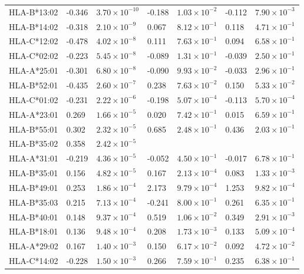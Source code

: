 \documentclass[]{article}
\begin{document}
\begin{doublespace}
\begin{longtable}[H]{p{3cm}p{1cm}p{2cm}p{1cm}p{2cm}p{1cm}p{2cm}}
		HLA-B*13:02 & -0.346 & $3.70 \times 10^{-10}$ & -0.188 & $1.03 \times 10^{-2}$ & -0.112 & $7.90 \times 10^{-3}$ \\ 
		HLA-B*14:02 & -0.318 & $2.10 \times 10^{-9}$ & 0.067 & $8.12 \times 10^{-1}$ & 0.118 & $4.71 \times 10^{-1}$ \\ 
		HLA-C*12:02 & -0.478 & $4.02 \times 10^{-8}$ & 0.111 & $7.63 \times 10^{-1}$ & 0.094 & $6.58 \times 10^{-1}$ \\ 
		HLA-C*02:02 & -0.223 & $5.45 \times 10^{-8}$ & -0.089 & $1.31 \times 10^{-1}$ & -0.039 & $2.50 \times 10^{-1}$ \\ 
		HLA-A*25:01 & -0.301 & $6.80 \times 10^{-8}$ & -0.090 & $9.93 \times 10^{-2}$ & -0.033 & $2.96 \times 10^{-1}$ \\ 
		HLA-B*52:01 & -0.435 & $2.60 \times 10^{-7}$ & 0.238 & $7.63 \times 10^{-2}$ & 0.150 & $5.33 \times 10^{-2}$ \\ 
		HLA-C*01:02 & -0.231 & $2.22 \times 10^{-6}$ & -0.198 & $5.07 \times 10^{-4}$ & -0.113 & $5.70 \times 10^{-4}$ \\ 
		HLA-A*23:01 & 0.269 & $1.66 \times 10^{-5}$ & 0.020 & $7.42 \times 10^{-1}$ & 0.015 & $6.59 \times 10^{-1}$ \\ 
		HLA-B*55:01 & 0.302 & $2.32 \times 10^{-5}$ & 0.685 & $2.48 \times 10^{-1}$ & 0.436 & $2.03 \times 10^{-1}$ \\ 
		HLA-B*35:02 & 0.358 & $2.42 \times 10^{-5}$ &  &  &  &  \\ 
		HLA-A*31:01 & -0.219 & $4.36 \times 10^{-5}$ & -0.052 & $4.50 \times 10^{-1}$ & -0.017 & $6.78 \times 10^{-1}$ \\ 
		HLA-B*35:01 & 0.156 & $4.82 \times 10^{-5}$ & 0.167 & $2.13 \times 10^{-4}$ & 0.083 & $1.33 \times 10^{-3}$ \\ 
		HLA-B*49:01 & 0.253 & $1.86 \times 10^{-4}$ & 2.173 & $9.79 \times 10^{-4}$ & 1.253 & $9.82 \times 10^{-4}$ \\ 
		HLA-B*35:03 & 0.215 & $7.13 \times 10^{-4}$ & -0.241 & $8.00 \times 10^{-1}$ & 0.261 & $6.35 \times 10^{-1}$ \\ 
		HLA-B*40:01 & 0.148 & $9.37 \times 10^{-4}$ & 0.519 & $1.06 \times 10^{-2}$ & 0.349 & $2.91 \times 10^{-3}$ \\ 
		HLA-B*18:01 & 0.136 & $9.48 \times 10^{-4}$ & 0.208 & $1.73 \times 10^{-3}$ & 0.133 & $5.09 \times 10^{-4}$ \\ 
		HLA-A*29:02 & 0.167 & $1.40 \times 10^{-3}$ & 0.150 & $6.17 \times 10^{-2}$ & 0.092 & $4.72 \times 10^{-2}$ \\ 
		HLA-C*14:02 & -0.228 & $1.50 \times 10^{-3}$ & 0.266 & $7.59 \times 10^{-1}$ & 0.235 & $6.38 \times 10^{-1}$ \\ 

\end{longtable}
\end{doublespace}
\end{document}
